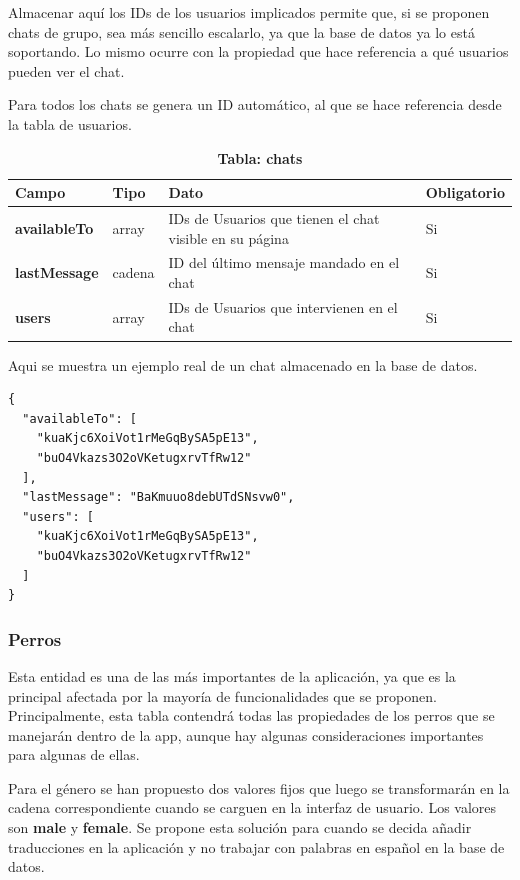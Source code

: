 \documentclass[a4paper, 12pt]{article}
\begin{document}
Almacenar aquí los IDs de los usuarios implicados permite que, si se proponen chats de grupo, sea más sencillo escalarlo, ya que la base de datos ya lo está soportando. Lo mismo ocurre con la propiedad que hace referencia a qué usuarios pueden ver el chat.

Para todos los chats se genera un ID automático, al que se hace referencia desde la tabla de usuarios.

\begin{table}[H]
\captionsetup{justification=raggedright,singlelinecheck=false}
\caption{\textbf{Tabla: chats}}
\label{tab:chats}
	\begin{tabular}{|m{3cm}|m{2cm}|m{5cm}|m{3cm}|}
	\hline
	\textbf{Campo} & \textbf{Tipo} & \textbf{Dato} & \textbf{Obligatorio} \\ 
	\hline
	\textbf{availableTo} & array & IDs de Usuarios que tienen el chat visible en su página & Si \\ 
	\hline
	\textbf{lastMessage} & cadena & ID del último mensaje mandado en el chat & Si\\ 
	\hline
	\textbf{users} &  array & IDs de Usuarios que intervienen en el chat & Si \\ 
	\hline
\end{tabular}
\end{table}

Aqui se muestra un ejemplo real de un chat almacenado en la base de datos. 

\begin{verbatim}
{
  "availableTo": [
    "kuaKjc6XoiVot1rMeGqBySA5pE13",
    "buO4Vkazs3O2oVKetugxrvTfRw12"
  ],
  "lastMessage": "BaKmuuo8debUTdSNsvw0",
  "users": [
    "kuaKjc6XoiVot1rMeGqBySA5pE13",
    "buO4Vkazs3O2oVKetugxrvTfRw12"
  ]
}
\end{verbatim}

\subsubsection{Perros}

Esta entidad es una de las más importantes de la aplicación, ya que es la principal afectada por la mayoría de funcionalidades que se proponen. Principalmente, esta tabla contendrá todas las propiedades de los perros que se manejarán dentro de la app, aunque hay algunas consideraciones importantes para algunas de ellas.

Para el género se han propuesto dos valores fijos que luego se transformarán en la cadena correspondiente cuando se carguen en la interfaz de usuario. Los valores son \textbf{male} y \textbf{female}. Se propone esta solución para cuando se decida añadir traducciones en la aplicación y no trabajar con palabras en español en la base de datos.
\end{document}
